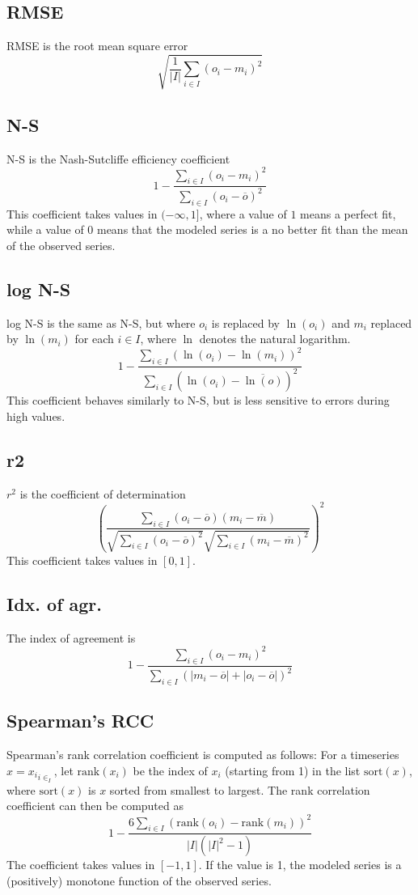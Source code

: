 \documentclass[11pt]{article}
\theoremstyle{definition}
\begin{document}
\subsection{RMSE}
RMSE is the root mean square error
\[
\sqrt{\frac{1}{|I|}\sum_{i\in I}(o_i-m_i)^2}
\]

\subsection{N-S}
N-S is the Nash-Sutcliffe efficiency coefficient
\[
1 - \frac{\sum_{i\in I}(o_i - m_i)^2}{\sum_{i\in I}(o_i-\overline{o})^2}
\]
This coefficient takes values in $(-\infty, 1]$, where a value of $1$ means a perfect fit, while a value of $0$ means that the modeled series is a no better fit than the mean of the observed series.

\subsection{log N-S}
log N-S is the same as N-S, but where $o_i$ is replaced by $\ln(o_i)$ and $m_i$ replaced by $\ln(m_i)$ for each $i\in I$, where $\ln$ denotes the natural logarithm.
\[
1 - \frac{\sum_{i\in I}(\ln(o_i) - \ln(m_i))^2}{\sum_{i\in I}(\ln(o_i)-\overline{\ln(o)})^2}
\]
This coefficient behaves similarly to N-S, but is less sensitive to errors during high values.

\subsection{r2}
$r^2$ is the coefficient of determination
\[
\left(\frac{\sum_{i\in I}(o_i-\overline{o})(m_i-\overline{m})}{\sqrt{\sum_{i\in I}(o_i-\overline{o})^2}\sqrt{\sum_{i\in I}(m_i-\overline{m})^2}}\right)^2
\]
This coefficient takes values in $[0, 1]$.

\subsection{Idx. of agr.}
The index of agreement is
\[
1 - \frac{\sum_{i\in I}(o_i-m_i)^2}{\sum_{i\in I}(|m_i-\overline{o}| + |o_i-\overline{o}|)^2}
\]

\subsection{Spearman's RCC}
Spearman's rank correlation coefficient \cite{spearman04} is computed as follows: For a timeseries $x={x_i}_{i\in_I}$, let $\mathrm{rank}(x_i)$ be the index of $x_i$ (starting from 1) in the list $\mathrm{sort}(x)$, where $\mathrm{sort}(x)$ is $x$ sorted from smallest to largest. The rank correlation coefficient can then be computed as
\[
1 - \frac{6\sum_{i\in I}(\mathrm{rank}(o_i)-\mathrm{rank}(m_i))^2}{|I|(|I|^2 - 1)}
\]
The coefficient takes values in $[-1, 1]$. If the value is 1, the modeled series is a (positively) monotone function of the observed series.




\end{document}
